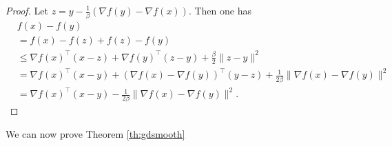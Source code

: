 \begin{proof}
Let $z = y - \frac{1}{\beta} (\nabla f(y) - \nabla f(x))$. Then one has
\begin{align*}
& f(x) - f(y) \\
& = f(x) - f(z) + f(z) - f(y) \\
& \leq \nabla f(x)^{\top} (x-z) + \nabla f(y)^{\top} (z-y) + \frac{\beta}{2} \|z - y\|^2 \\
& = \nabla f(x)^{\top}(x-y) + (\nabla f(x) - \nabla f(y))^{\top} (y-z) + \frac{1}{2 \beta} \|\nabla f(x) - \nabla f(y)\|^2 \\
& = \nabla f(x)^{\top} (x - y) - \frac{1}{2 \beta} \|\nabla f(x) - \nabla f(y)\|^2 .
\end{align*}
\end{proof}

We can now prove Theorem \ref{th:gdsmooth}

